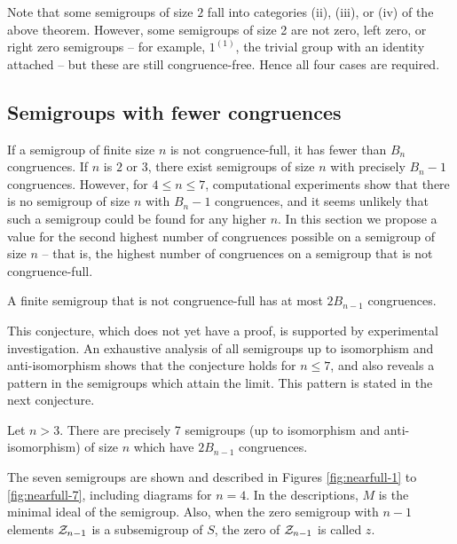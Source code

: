 Note that some semigroups of size $2$ fall into categories (ii), (iii), or (iv) of
the above theorem.  However, some semigroups of size 2 are not zero, left zero,
or right zero semigroups -- for example, $1^{(1)}$, the trivial group with an
identity attached -- but these are still congruence-free.  Hence all four cases
are required.



\subsection{Semigroups with fewer congruences}

If a semigroup of finite size $n$ is not congruence-full, it has fewer than
$B_n$ congruences.  If $n$ is $2$ or $3$, there exist semigroups of size $n$
with precisely $B_n - 1$ congruences.  However, for $4 \leq n \leq 7$,
computational experiments show that there is no semigroup of size $n$ with
$B_n - 1$ congruences, and it seems unlikely that such a semigroup could be
found for any higher $n$.  In this section we propose a value for the second
highest number of congruences possible on a semigroup of size $n$ -- that is, the
highest number of congruences on a semigroup that is not congruence-full.

\begin{conjecture}
  \label{conj:not-cong-full}
  A finite semigroup that is not congruence-full has at most
  $2B_{n-1}$ congruences.
\end{conjecture}

This conjecture, which does not yet have a proof, is supported by experimental
investigation.  An exhaustive analysis of all semigroups up to isomorphism and
anti-isomorphism shows that the conjecture holds for $n \leq 7$, and also
reveals a pattern in the semigroups which attain the limit.  This pattern is
stated in the next conjecture.

\begin{conjecture}
  \label{conj:cong-nearfull-7}
  Let $n > 3$.  There are precisely 7 semigroups (up to isomorphism and
  anti-isomorphism) of size $n$ which have $2B_{n-1}$ congruences.
\end{conjecture}

The seven semigroups are shown and described in Figures \ref{fig:nearfull-1} to
\ref{fig:nearfull-7}, including diagrams for $n = 4$.  In the descriptions, $M$
is the minimal ideal of the semigroup.  Also, when
the zero semigroup with $n-1$ elements $\mathcal{Z}_{n-1}$ is a subsemigroup of $S$, the
zero of $\mathcal{Z}_{n-1}$ is called $z$.

